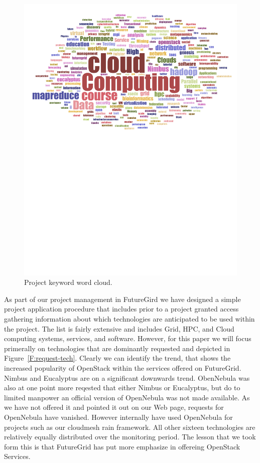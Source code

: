 \begin{figure}[htb]
\begin{minipage}[t]{0.5\textwidth}
  \centering
    \includegraphics[width=1.0\textwidth]{images/fg-keyword-wordcloud.pdf}
  \caption{Project keyword word cloud.}\label{F:keycloud}
\end{minipage}
\end{figure}


As part of our project management in FutureGird we have designed a
simple project application procedure that includes prior to a project
granted access gathering information about which technologies are
anticipated to be used within the project. The list is fairly
extensive and includes Grid, HPC, and Cloud computing systems,
services, and software. However, for this paper we will focus
primerally on technologies that are dominantly requested and depicted
in Figure~\ref{F:request-tech}. Clearly we can identify the trend,
that shows the increased popularity of OpenStack within the services
offered on FutureGrid. Nimbus and Eucalyptus are on a significant
downwards trend. ObenNebula was also at one point more reqested that
either Nimbus or Eucalyptus, but do to limited manpower an official
version of OpenNebula was not made available. As we have not offered
it and pointed it out on our Web page, requests for OpenNebula have vanished.
However internally have used OpenNebula for projects such as our cloudmesh rain
framework. All other sixteen technologies are relatively equally
distributed over the monitoring period. The lesson that we took form
this is that FutureGrid has put more emphasize in offereing OpenStack Services.

